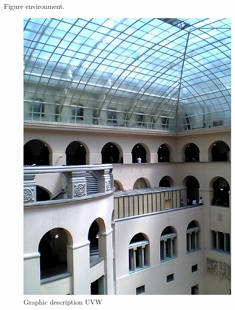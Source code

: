 Figure environment.

\begin{figure}[!ht]
\centering
\includegraphics[width=\linewidth]{./section-introduction/figures/uzhlichthof.jpg}
\caption[Graphikbeschriftung MNO]{Graphic description UVW}
\label{f:fig1}
\end{figure}
